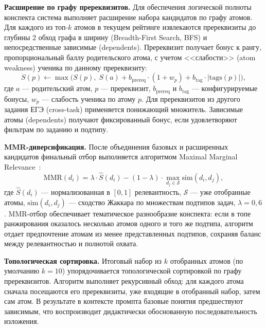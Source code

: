 \documentclass[a4paper,12pt]{extarticle}
\begin{document}
\textbf{Расширение по графу пререквизитов.} Для обеспечения логической полноты
конспекта система выполняет расширение набора кандидатов по графу атомов.
Для каждого из топ-$k$ атомов в текущем рейтинге извлекаются пререквизиты до
глубины 2 обход графа в ширину (Breadth-First Search, BFS) и непосредственные зависимые (dependents). Пререквизит
получает бонус к рангу, пропорциональный баллу родительского атома, с учетом
<<слабости>> (atom weakness) ученика по данному пререквизиту:
\begin{equation}
    \label{eq:prereq_bonus}
    S(p) \leftarrow \max\bigl(S(p),\; S(a) + b_{\mathrm{prereq}} \cdot (1 + w_p)
        + b_{\mathrm{tag}} \cdot |\mathrm{tags}(p)|\bigr),
\end{equation}
где $a$ --- родительский атом, $p$ --- пререквизит, $b_{\mathrm{prereq}}$ и
$b_{\mathrm{tag}}$ --- конфигурируемые бонусы, $w_p$ --- слабость ученика по атому
$p$. Для пререквизитов из другого задания ЕГЭ (cross-task) применяется понижающий
множитель. Зависимые атомы (dependents) получают фиксированный бонус, если
удовлетворяют фильтрам по заданию и подтипу.

\textbf{MMR-диверсификация.} После объединения базовых и расширенных кандидатов
финальный отбор выполняется алгоритмом Maximal Marginal
Relevance~\cite{carbonell1998mmr}:
\begin{equation}
    \label{eq:mmr}
    \mathrm{MMR}(d_i) = \lambda \cdot \hat{S}(d_i)
        - (1 - \lambda) \cdot \max_{d_j \in \mathcal{S}} \mathrm{sim}(d_i, d_j),
\end{equation}
где $\hat{S}(d_i)$ --- нормализованная в $[0, 1]$ релевантность, $\mathcal{S}$ ---
уже отобранные атомы, $\mathrm{sim}(d_i, d_j)$ --- сходство Жаккара по множествам
подтипов задач, $\lambda = 0{,}6$. MMR-отбор обеспечивает тематическое разнообразие
конспекта: если в топе ранжирования оказалось несколько атомов одного и того же
подтипа, алгоритм отдает предпочтение атомам из менее представленных подтипов,
сохраняя баланс между релевантностью и полнотой охвата.

\textbf{Топологическая сортировка.} Итоговый набор из $k$ отобранных атомов
(по умолчанию $k = 10$) упорядочивается топологической сортировкой по графу
пререквизитов. Алгоритм выполняет рекурсивный обход: для каждого атома сначала
посещаются его пререквизиты, уже входящие в отобранный набор, затем сам атом.
В результате в контексте промпта базовые понятия предшествуют зависимым,
что воспроизводит дидактически обоснованную последовательность изложения.
\end{document}

